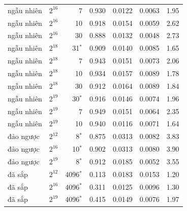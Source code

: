 \begin{longtable}{llrcccc}
ngẫu nhiên & $2^{16}$ & 7 & 0.930 & 0.0122 & 0.0063 & 1.95 \\
ngẫu nhiên & $2^{16}$ & 10 & 0.918 & 0.0154 & 0.0059 & 2.62 \\
ngẫu nhiên & $2^{16}$ & 30 & 0.888 & 0.0132 & 0.0048 & 2.73 \\
ngẫu nhiên & $2^{18}$ & 31$^*$ & 0.909 & 0.0140 & 0.0085 & 1.65 \\
ngẫu nhiên & $2^{18}$ & 7 & 0.943 & 0.0151 & 0.0073 & 2.06 \\
ngẫu nhiên & $2^{18}$ & 10 & 0.934 & 0.0157 & 0.0089 & 1.78 \\
ngẫu nhiên & $2^{18}$ & 30 & 0.912 & 0.0164 & 0.0089 & 1.84 \\
ngẫu nhiên & $2^{19}$ & 30$^*$ & 0.916 & 0.0146 & 0.0074 & 1.96 \\
ngẫu nhiên & $2^{19}$ & 7 & 0.949 & 0.0151 & 0.0064 & 2.35 \\
ngẫu nhiên & $2^{19}$ & 10 & 0.940 & 0.0116 & 0.0071 & 1.64 \\
đảo ngược & $2^{12}$ & 8$^*$ & 0.875 & 0.0313 & 0.0082 & 3.83 \\
đảo ngược & $2^{16}$ & 10$^*$ & 0.902 & 0.0313 & 0.0080 & 3.90 \\
đảo ngược & $2^{19}$ & 8$^*$ & 0.912 & 0.0185 & 0.0052 & 3.55 \\
đã sắp & $2^{12}$ & 4096$^*$ & 0.113 & 0.0183 & 0.0153 & 1.20 \\
đã sắp & $2^{16}$ & 4096$^*$ & 0.311 & 0.0125 & 0.0096 & 1.30 \\
đã sắp & $2^{19}$ & 4096$^*$ & 0.415 & 0.0149 & 0.0076 & 1.97 \\
\end{longtable}
